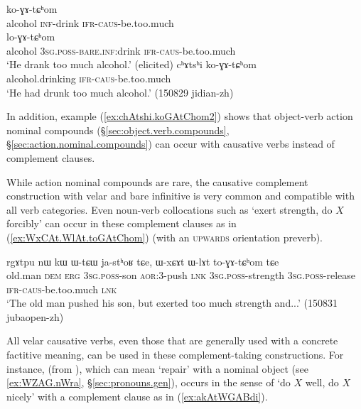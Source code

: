 \begin{exe}
\ex \label{ex:GAtChom}
\begin{xlist}
\ex \label{ex:kAtshi.koGAtChom}
 ko-ɣɤ-tɕʰom \\
alcohol \textsc{inf}-drink \textsc{ifr}-\textsc{caus}-be.too.much \\
\ex \label{ex:Wtshi.loGAtChom}
 lo-ɣɤ-tɕʰom \\
alcohol \textsc{3sg}.\textsc{poss}-\textsc{bare}.\textsc{inf}:drink \textsc{ifr}-\textsc{caus}-be.too.much \\
\glt `He drank too much alcohol.' (elicited)
\ex \label{ex:chAtshi.koGAtChom2}
\gll cʰɤtsʰi ko-ɣɤ-tɕʰom \\
alcohol.drinking \textsc{ifr}-\textsc{caus}-be.too.much \\
\glt `He had drunk too much alcohol.' (150829 jidian-zh)
\end{xlist}
\end{exe}

In addition, example (\ref{ex:chAtshi.koGAtChom2}) shows that object-verb action nominal compounds (§\ref{sec:object.verb.compounds}, §\ref{sec:action.nominal.compounds}) can occur with causative verbs instead of complement clauses.

While action nominal compounds are rare, the causative complement construction with velar and bare infinitive is very common and compatible with all verb categories. Even noun-verb collocations such as  `exert strength, do $X$ forcibly' can occur in these complement clauses as in (\ref{ex:WxCAt.WlAt.toGAtChom}) (with an  \textsc{upwards} orientation preverb).

\begin{exe}
\ex \label{ex:WxCAt.WlAt.toGAtChom}
\gll  rgɤtpu nɯ kɯ ɯ-tɕɯ ja-stʰoʁ tɕe, ɯ-xɕɤt ɯ-lɤt to-ɣɤ-tɕʰom tɕe \\
old.man \textsc{dem} \textsc{erg} \textsc{3sg}.\textsc{poss}-son \textsc{aor}:3\flobv{}-push \textsc{lnk} \textsc{3sg}.\textsc{poss}-strength \textsc{3sg}.\textsc{poss}-release \textsc{ifr}-\textsc{caus}-be.too.much \textsc{lnk} \\
\glt `The old man pushed his son, but exerted too much strength and...'   (150831 jubaopen-zh)
\end{exe}

All velar causative verbs, even those that are generally used with a concrete factitive meaning, can be used in these com\-ple\-ment-taking constructions. For instance,  (from ), which can mean `repair' with a nominal object (see \ref{ex:WZAG.nWra}, §\ref{sec:pronouns.gen}), occurs in the sense of `do $X$ well, do $X$ nicely' with a complement clause as in (\ref{ex:akAtWGABdi}).


